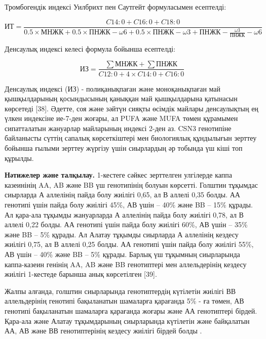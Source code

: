 Тромбогендік индексі Уилбрихт пен Саутгейт формуласымен есептелді:

\begin{equation}
  \text{ИТ} = \frac{C14:0 + C16:0 + C18:0}{0.5 \times \text{МНЖК} + 0.5 \times \text{ПНЖК}-\omega6 + 0.5 \times \text{ПНЖК}-\omega3 + \text{ПНЖК}-\frac{\omega3}{\text{ПНЖК}}-\omega6}
  \end{equation}

Денсаулық индексі келесі формула бойынша есептелді:

\begin{equation}
  \text{ИЗ} = \frac{\sum \text{МНЖК} + \sum \text{ПНЖК}}{C12:0 + 4 \times C14:0 + C16:0}
  \end{equation}


\begin{multicols}{2}
Денсаулық индексі (ИЗ) - полиқанықпаған және моноқанықпаған май
қышқылдарының қосындысының қаныққан май қышқылдарына қатынасын көрсетеді
{[}38{]}. Әдетте, соя және зәйтүн сияқты өсімдік майлары денсаулықтың ең
үлкен индексіне ие-7-ден жоғары, ал PUFA және MUFA төмен құрамымен
сипатталатын жануарлар майларының индексі 2-ден аз. CSN3 генотипіне
байланысты сүттің сапалық көрсеткіштері мен биологиялық құндылығын
зерттеу бойынша ғылыми зерттеу жүргізу үшін сиырлардың әр тобында үш
кіші топ құрылды.

{\bfseries Нәтижелер және талқылау.} 1-кестеге сәйкес зерттелген улгілерде
каппа казеинінің AA, AB және BB үш генотипінің болуын көрсетті. Голштин
тұқымдас сиырларда А аллелінің пайда болу жиілігі 0,65, ал В аллелі 0,35
болды. АА генотипі үшін пайда болу жиілігі 45\%, АВ үшін -- 40\% және BB
-- 15\% құрады. Ал қара-ала тұқымды жануарларда А аллелінің пайда болу
жиілігі 0,78, ал В аллелі 0,22 болды. АА генотипі үшін пайда болу
жиілігі 60\%, АВ үшін -- 35\% және BB -- 5\% құрады. Ал Алатау тұқымды
сиырларда А аллелінің кездесу жиілігі 0,75, ал В аллелі 0,25 болды. АА
генотипі үшін пайда болу жиілігі 55\%, АВ үшін -- 40\% және BB -- 5\%
құрады. Барлық үш тұқымның сиырларында каппа-казеин генінің AA, AB және
BB генотиптері мен аллельдерінің кездесу жиілігі 1-кестеде барынша анық
көрсетілген {[}39{]}.


Жалпы алғанда, голштин сиырларында генотиптердің күтілетін жиілігі ВВ
аллельдерінің генотипі бақыланатын шамаларға қарағанда 5\% - ға төмен,
АВ генотипі бақыланатын шамаларға қарағанда жоғары және АА генотиптері
бірдей. Қара-ала және Алатау тұқымдарының сиырларында күтілетін және
байқалатын АА, АВ және ВВ генотиптерінің кездесу жиілігі бірдей болды .


\end{multicols}
